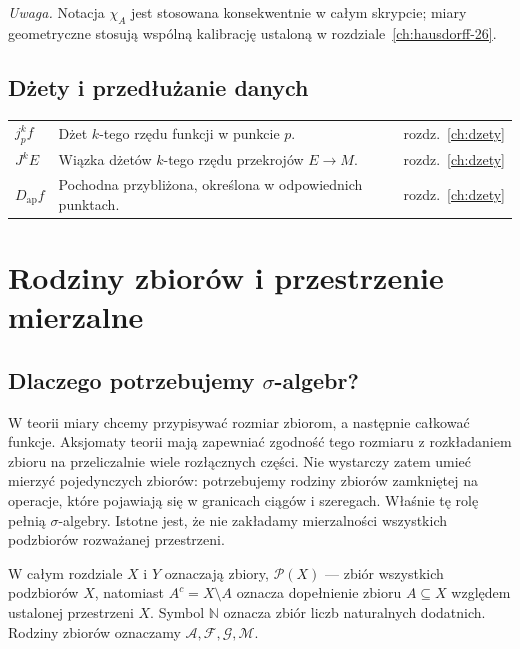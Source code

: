 \documentclass[11pt,a4paper,oneside]{book}
\numberwithin{equation}{chapter}
\theoremstyle{plain}
\theoremstyle{definition}
\theoremstyle{remark}
\begin{document}
\noindent\emph{Uwaga.} Notacja $\chi_A$ jest stosowana konsekwentnie
w całym skrypcie; miary geometryczne stosują wspólną kalibrację
ustaloną w rozdziale~\ref{ch:hausdorff-26}.


\section*{Dżety i przedłużanie danych}
\begin{longtable}{@{}p{}p{}p{}@{}}
$j_p^kf$ & Dżet $k$-tego rzędu funkcji w punkcie $p$. & rozdz.~\ref{ch:dzety} \\
$J^kE$ & Wiązka dżetów $k$-tego rzędu przekrojów $E\to M$. & rozdz.~\ref{ch:dzety} \\
$D_{\mathrm{ap}}f$ & Pochodna przybliżona, określona w odpowiednich punktach. & rozdz.~\ref{ch:dzety} \\
\end{longtable}



\mainmatter

\chapter{Rodziny zbiorów i przestrzenie mierzalne}
\label{ch:przestrzenie-mierzalne}

\section{Dlaczego potrzebujemy \texorpdfstring{$\sigma$}{sigma}-algebr?}

W teorii miary chcemy przypisywać rozmiar zbiorom, a następnie całkować funkcje.
Aksjomaty teorii mają zapewniać zgodność tego rozmiaru z rozkładaniem zbioru
na przeliczalnie wiele rozłącznych części. Nie wystarczy zatem umieć mierzyć
pojedynczych zbiorów: potrzebujemy rodziny zbiorów zamkniętej na operacje,
które pojawiają się w granicach ciągów i szeregach. Właśnie tę rolę pełnią
$\sigma$-algebry. Istotne jest, że nie zakładamy mierzalności wszystkich
podzbiorów rozważanej przestrzeni.

W całym rozdziale $X$ i $Y$ oznaczają zbiory, $\mathcal P(X)$ --- zbiór
wszystkich podzbiorów $X$, natomiast $A^c=X\setminus A$ oznacza dopełnienie
zbioru $A\subseteq X$ względem ustalonej przestrzeni $X$. Symbol $\mathbb N$
oznacza zbiór liczb naturalnych dodatnich. Rodziny zbiorów oznaczamy
$\mathcal A,\mathcal F,\mathcal G,\mathcal M$.
\end{document}
